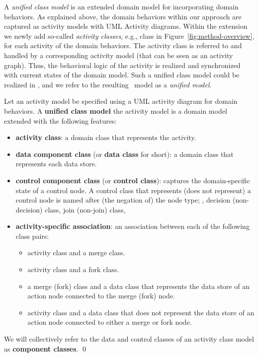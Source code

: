 A \textit{unified class model} is an extended domain model for incorporating domain behaviors. As explained above, the domain behaviors within our approach are captured as activity models with UML Activity diagrams. Within the extension we newly add so-called \textit{activity classes}, e.g., class  in Figure~\ref{fig:method-overview}, for each activity of the domain behaviors. The activity class is referred to and handled by a corresponding activity model (that can be seen as an activity graph). Thus, the behavioral logic of the activity is realized and synchronized with current states of the domain model. Such a unified class model could be realized in \dcsl, and we refer to the resulting \dcsl~model as a \textit{unified model}.

\begin{definition} \label{def:unified-class-model}
	Let an activity model be specified using a UML activity diagram for domain behaviors. A \textbf{unified class model} \wrt the activity model is a domain model extended with the following features:
	
	\begin{itemize}%
		\item \textbf{activity class}: a domain class that represents the activity.
		\item \textbf{data component class} (or \textbf{data class} for short): a domain class that represents each data store.
		\item \textbf{control component class} (or \textbf{control class}): captures the domain-specific state of a control node. A control class that represents (does not represent) a control node is named after (the negation of) the node type; \eg, decision (non-decision) class, join (non-join) class, \etc
		\item \textbf{activity-specific association}: an association between each of the following class pairs:
		\begin{itemize}
			\item activity class and a merge class.
			\item activity class and a fork class.
			\item a merge (fork) class and a data class that represents the data store of an action node connected to the merge (fork) node.
			\item activity class and a data class that does not represent the data store of an action node connected to either a merge or fork node.
		\end{itemize}        	
	\end{itemize}
	We will collectively refer to the data and control classes of an activity class model as \textbf{component classes}. \qed
\end{definition}

